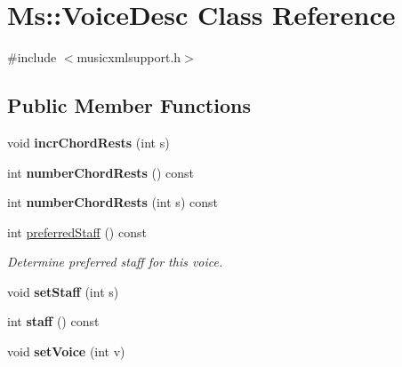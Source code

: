 \hypertarget{class_ms_1_1_voice_desc}{}\section{Ms\+:\+:Voice\+Desc Class Reference}
\label{class_ms_1_1_voice_desc}


{\ttfamily \#include $<$musicxmlsupport.\+h$>$}

\subsection*{Public Member Functions}
\begin{DoxyCompactItemize}
\item 
\mbox{\label{class_ms_1_1_voice_desc_a946c7eb8e2645cce7062221f077c92fe}} 
void {\bfseries incr\+Chord\+Rests} (int s)
\item 
\mbox{\label{class_ms_1_1_voice_desc_ae21139d8e8e852e82e800b88eefeacad}} 
int {\bfseries number\+Chord\+Rests} () const
\item 
\mbox{\label{class_ms_1_1_voice_desc_a84a6b5804cb3c4efe4f12a54894e7e3e}} 
int {\bfseries number\+Chord\+Rests} (int s) const
\item 
\mbox{\label{class_ms_1_1_voice_desc_ad66445a58db71f67825216adb2d2767e}} 
int \hyperlink{class_ms_1_1_voice_desc_ad66445a58db71f67825216adb2d2767e}{preferred\+Staff} () const
\begin{DoxyCompactList}\small\item\em Determine preferred staff for this voice. \end{DoxyCompactList}\item 
\mbox{\label{class_ms_1_1_voice_desc_aa849ea4fa842c71a125f8b57ad3be89f}} 
void {\bfseries set\+Staff} (int s)
\item 
\mbox{\label{class_ms_1_1_voice_desc_abfc96628833e3796e4bc008173fe475d}} 
int {\bfseries staff} () const
\item 
\mbox{\label{class_ms_1_1_voice_desc_a6d877646681bcd4a3b8d4bae7d1117cf}} 
void {\bfseries set\+Voice} (int v)

\end{DoxyCompactItemize}
